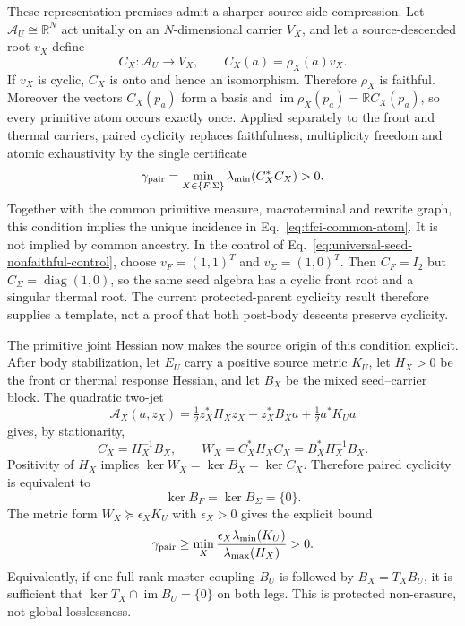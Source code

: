 \documentclass[11pt]{article}
\begin{document}
These representation premises admit a sharper source-side compression.  Let
$\mathcal A_U\cong\mathbb R^N$ act unitally on an $N$-dimensional carrier
$V_X$, and let a source-descended root $v_X$ define
\begin{equation}
 C_X:\mathcal A_U\longrightarrow V_X,
 \qquad C_X(a)=\rho_X(a)v_X.
 \label{eq:cyclic-source-evaluation}
\end{equation}
If $v_X$ is cyclic, $C_X$ is onto and hence an isomorphism.  Therefore
$\rho_X$ is faithful.  Moreover the vectors $C_X(p_a)$ form a basis and
$\operatorname{im}\rho_X(p_a)=\mathbb R C_X(p_a)$, so every primitive atom
occurs exactly once.  Applied separately to the front and thermal carriers,
paired cyclicity replaces faithfulness, multiplicity freedom and atomic
exhaustivity by the single certificate
\begin{equation}
 \gamma_{\rm pair}
 =\min_{X\in\{F,\Sigma\}}
 \lambda_{\min}(C_X^*C_X)>0.
 \label{eq:paired-cyclic-gram}
\end{equation}
Together with the common primitive measure, macroterminal and rewrite graph,
this condition implies the unique incidence in
Eq.~\eqref{eq:tfci-common-atom}.  It is not implied by common ancestry.  In
the control of Eq.~\eqref{eq:universal-seed-nonfaithful-control}, choose
$v_F=(1,1)^T$ and $v_\Sigma=(1,0)^T$.  Then $C_F=I_2$ but
$C_\Sigma=\operatorname{diag}(1,0)$, so the same seed algebra has a cyclic
front root and a singular thermal root.  The current protected-parent
cyclicity result therefore supplies a template, not a proof that both
post-body descents preserve cyclicity.

The primitive joint Hessian now makes the source origin of this condition
explicit.  After body stabilization, let $E_U$ carry a positive source metric
$K_U$, let $H_X>0$ be the front or thermal response Hessian, and let $B_X$ be
the mixed seed--carrier block.  The quadratic two-jet
\begin{equation}
 \mathcal A_X(a,z_X)=\tfrac12 z_X^*H_Xz_X-z_X^*B_Xa
 +\tfrac12a^*K_Ua
 \label{eq:primitive-paired-work-action}
\end{equation}
gives, by stationarity,
\begin{equation}
 C_X=H_X^{-1}B_X,
 \qquad W_X=C_X^*H_XC_X=B_X^*H_X^{-1}B_X.
 \label{eq:primitive-paired-work-gram}
\end{equation}
Positivity of $H_X$ implies
$\ker W_X=\ker B_X=\ker C_X$.  Therefore paired cyclicity is equivalent to
\begin{equation}
 \ker B_F=\ker B_\Sigma=\{0\}.
 \label{eq:paired-mixed-block-injectivity}
\end{equation}
The metric form
$W_X\succeq\epsilon_XK_U$ with $\epsilon_X>0$ gives the explicit bound
\begin{equation}
 \gamma_{\rm pair}\ge
 \min_X\frac{\epsilon_X\lambda_{\min}(K_U)}
                 {\lambda_{\max}(H_X)}>0.
 \label{eq:paired-work-lower-bound}
\end{equation}
Equivalently, if one full-rank master coupling $B_U$ is followed by
$B_X=T_XB_U$, it is sufficient that
$\ker T_X\cap\operatorname{im}B_U=\{0\}$ on both legs.  This is protected
non-erasure, not global losslessness.
\end{document}
